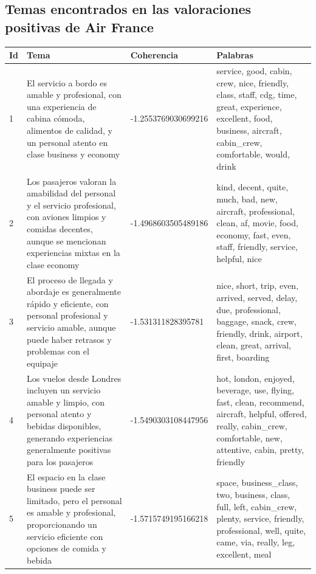 \documentclass{report}
\begin{document}
            \clearpage\subsection{Temas encontrados en las valoraciones positivas de Air France}
                \label{tab:temas_air_france_positivas}
                \begin{longtable}{|p{1cm}|p{4cm}|p{4cm}|p{6cm}|}
                    \hline
                    \textbf{Id} & \textbf{Tema} & \textbf{Coherencia} & \textbf{Palabras} \\
                    \hline
                    1 & El servicio a bordo es amable y profesional, con una experiencia de cabina cómoda, alimentos de calidad, y un personal atento en clase business y economy & -1.2553769030699216 & service, good, cabin, crew, nice, friendly, class, staff, cdg, time, great, experience, excellent, food, business, aircraft, cabin\_crew, comfortable, would, drink \\
                    \hline
                    2 & Los pasajeros valoran la amabilidad del personal y el servicio profesional, con aviones limpios y comidas decentes, aunque se mencionan experiencias mixtas en la clase economy & -1.4968603505489186 & kind, decent, quite, much, bad, new, aircraft, professional, clean, af, movie, food, economy, fast, even, staff, friendly, service, helpful, nice \\
                    \hline
                    3 & El proceso de llegada y abordaje es generalmente rápido y eficiente, con personal profesional y servicio amable, aunque puede haber retrasos y problemas con el equipaje & -1.531311828395781 & nice, short, trip, even, arrived, served, delay, due, professional, baggage, snack, crew, friendly, drink, airport, clean, great, arrival, first, boarding \\
                    \hline
                    4 & Los vuelos desde Londres incluyen un servicio amable y limpio, con personal atento y bebidas disponibles, generando experiencias generalmente positivas para los pasajeros & -1.5490303108447956 & hot, london, enjoyed, beverage, use, flying, fast, clean, recommend, aircraft, helpful, offered, really, cabin\_crew, comfortable, new, attentive, cabin, pretty, friendly \\
                    \hline
                    5 & El espacio en la clase business puede ser limitado, pero el personal es amable y profesional, proporcionando un servicio eficiente con opciones de comida y bebida & -1.5715749195166218 & space, business\_class, two, business, class, full, left, cabin\_crew, plenty, service, friendly, professional, well, quite, came, via, really, leg, excellent, meal \\

\end{longtable}
\end{document}
